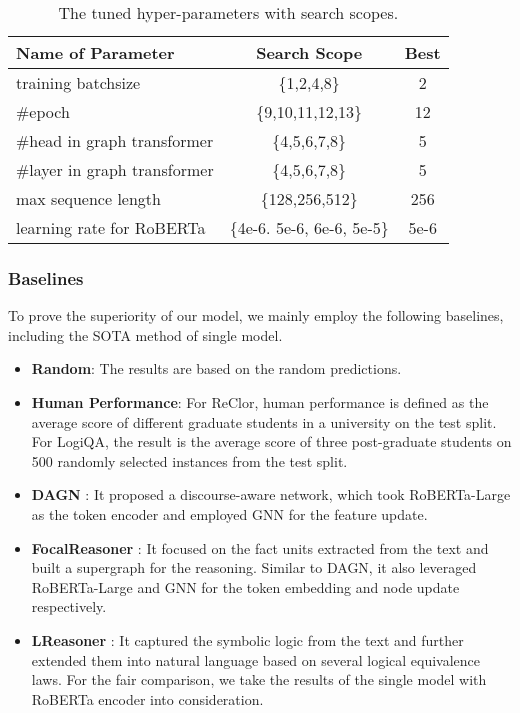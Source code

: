\documentclass[sigconf]{acmart}
\begin{document}
\begin{table}[t]
	\caption{The tuned hyper-parameters with search scopes.}
	\vspace{-0.3cm}
	\centering
	\begin{tabular}{p{3.8cm}|cc}
		\toprule
		\textbf{Name of Parameter} & \textbf{Search Scope} & \textbf{Best}\\
		\hline
		training batchsize &\{1,2,4,8\} &2 \\
		\#epoch &\{9,10,11,12,13\} &12 \\
		\#head in graph transformer &\{4,5,6,7,8\} &5\\
		\#layer in graph transformer &\{4,5,6,7,8\} &5\\
		max sequence length &\{128,256,512\} &256 \\
		learning rate for RoBERTa &\{4e-6. 5e-6, 6e-6, 5e-5\} &5e-6 \\
		\bottomrule
	\end{tabular}
	\label{tab:hyper}
	\vspace{-0.3cm}
\end{table}

\subsubsection{\textbf{Baselines}}
To prove the superiority of our model, we mainly employ the following baselines, including the SOTA method of single model. 

\begin{itemize}
	\item \textbf{Random}: The results are based on the random predictions.
	
	\item \textbf{Human Performance}\cite{yu2019reclor, liu2020logiqa}: For ReClor, human performance is defined as the average score of different graduate students in a university on the test split. For LogiQA, the result is the average score of three post-graduate students on 500 randomly selected instances from the test split.
	
	\item \textbf{DAGN} \cite{huang2021dagn}: It proposed a discourse-aware network, which took RoBERTa-Large\cite{liu2019roberta} as the token encoder and employed GNN for the feature update.
	
	\item \textbf{FocalReasoner} \cite{ouyang2021fact}: It focused on the fact units extracted from the text and built a supergraph for the reasoning. Similar to DAGN, it also leveraged RoBERTa-Large and GNN \cite{scarselli2008graph} for the token embedding and node update respectively.
	
	\item \textbf{LReasoner} \cite{wang2021logic}: It captured the symbolic logic from the text and further extended them into natural language based on several logical equivalence laws. For the fair comparison, we take the results of the single model with RoBERTa encoder into consideration.
\end{itemize}
\end{document}
